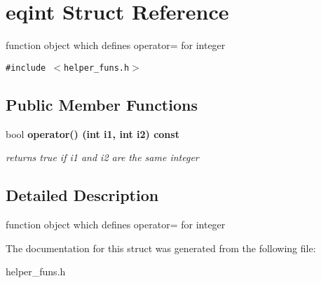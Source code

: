 \section{eqint Struct Reference}
\label{structeqint}
function object which defines operator= for integer  


{\tt \#include $<$helper\_\-funs.h$>$}

\subsection*{Public Member Functions}
\begin{CompactItemize}
\item 
bool \bf{operator()} (int i1, int i2) const \label{structeqint_e8d67831e565d1badf4f9e99a6cadcbc}

\begin{CompactList}\small\item\em returns true if i1 and i2 are the same integer \item\end{CompactList}\end{CompactItemize}


\subsection{Detailed Description}
function object which defines operator= for integer 



The documentation for this struct was generated from the following file:\begin{CompactItemize}
\item 
helper\_\-funs.h\end{CompactItemize}
